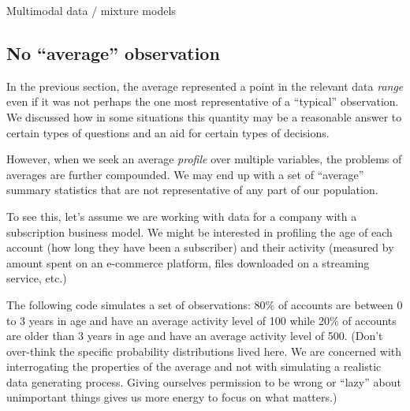 \documentclass[
]{krantz}
\begin{document}
Multimodal data / mixture models

\hypertarget{no-average-observation}{%
\subsection{No ``average'' observation}\label{no-average-observation}}

In the previous section, the average represented a point in the relevant data \emph{range} even if it was not perhaps the one most representative of a ``typical'' observation.
We discussed how in some situations this quantity may be a reasonable answer to certain types of questions and an aid for certain types of decisions.

However, when we seek an average \emph{profile} over multiple variables, the problems of averages are further compounded.
We may end up with a set of ``average'' summary statistics that are not representative of any part of our population.

To see this, let's assume we are working with data for a company with a subscription business model.
We might be interested in profiling the age of each account (how long they have been a subscriber) and their activity (measured by amount spent on an e-commerce platform, files downloaded on a streaming service, etc.)

The following code simulates a set of observations:
80\% of accounts are between 0 to 3 years in age and have an average activity level of 100 while 20\% of accounts are older than 3 years in age and have an average activity level of 500.
(Don't over-think the specific probability distributions lived here.
We are concerned with interrogating the properties of the average and not with simulating a realistic data generating process.
Giving ourselves permission to be wrong or ``lazy'' about unimportant things gives us more energy to focus on what matters.)
\end{document}
